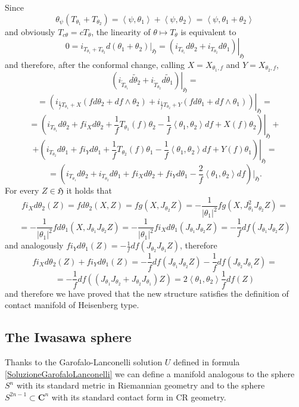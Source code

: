 \documentclass{article}
\newcommand{\g}[1]{\mathfrak{#1}}
\newcommand{\C}{\mathbf{C}}
\newcommand{\bra}{\left\langle}
\newcommand{\ket}{\right\rangle}
\theoremstyle{definition}
\theoremstyle{remark}
\begin{document}
Since
$$\theta_{\psi}(T_{\theta_1}+T_{\theta_2}) = \bra\psi,\theta_1\ket + \bra\psi,\theta_2\ket = \bra\psi,\theta_1+\theta_2\ket$$
and obviously $T_{c\theta}= cT_{\theta}$, the linearity of $\theta\mapsto T_{\theta}$ is equivalent to
$$0 = i_{T_{\theta_1}+T_{\theta_2}}d(\theta_1+\theta_2)|_{\g{H}} = \left.\left(i_{T_{\theta_1}}d\theta_2 + i_{T_{\theta_2}}d\theta_1\right)\right|_{\g{H}}$$
and therefore, after the conformal change, calling $X=X_{\theta_1,f}$ and $Y=X_{\theta_2,f}$,
$$\left.\left(i_{\widetilde{T}_{\theta_1}}d\widetilde{\theta}_2 + i_{\widetilde{T}_{\theta_2}}d\widetilde{\theta}_1\right)\right|_{\g{H}}=$$
$$= \left.\left(i_{\frac{1}{f}T_{\theta_1}+X}(fd\theta_2 +df\wedge\theta_2) + i_{\frac{1}{f}T_{\theta_2}+Y}(fd\theta_1 +df\wedge\theta_1)\right)\right|_{\g{H}}=$$
$$= \left.\left(i_{T_{\theta_1}}d\theta_2 + fi_Xd\theta_2  + \frac{1}{f}T_{\theta_1}(f)\theta_2 - \frac{1}{f}\bra\theta_1,\theta_2\ket df + X(f)\theta_2 \right)\right|_{\g{H}}+$$
$$+\left.\left(i_{T_{\theta_2}}d\theta_1 + fi_Yd\theta_1  + \frac{1}{f}T_{\theta_2}(f)\theta_1 - \frac{1}{f}\bra\theta_1,\theta_2\ket df + Y(f)\theta_1\right)\right|_{\g{H}}=$$
$$= \left(i_{T_{\theta_1}}d\theta_2 +i_{T_{\theta_2}}d\theta_1 + fi_Xd\theta_2 + fi_Yd\theta_1 - \frac{2}{f}\bra\theta_1,\theta_2\ket df \right)|_{\g{H}}.$$
For every $Z\in\g{H}$ it holds that
$$fi_Xd\theta_2(Z) = fd\theta_2(X,Z) = fg(X,J_{\theta_2}Z) = -\frac{1}{|\theta_1|^2}fg(X,J_{\theta_1}^2J_{\theta_2}Z) =$$
$$= -\frac{1}{|\theta_1|^2}fd\theta_1(X,J_{\theta_1}J_{\theta_2}Z) = -\frac{1}{|\theta_1|^2}fi_Xd\theta_1(J_{\theta_1}J_{\theta_2}Z) = -\frac{1}{f}df(J_{\theta_1}J_{\theta_2}Z)$$
and analogously $fi_Yd\theta_1(Z) = -\frac{1}{f}df(J_{\theta_2}J_{\theta_1}Z)$, therefore
$$fi_Xd\theta_2(Z)+fi_Yd\theta_1(Z) = -\frac{1}{f}df(J_{\theta_1}J_{\theta_2}Z) -\frac{1}{f}df(J_{\theta_2}J_{\theta_1}Z) =$$
$$= -\frac{1}{f}df((J_{\theta_1}J_{\theta_2} +J_{\theta_2}J_{\theta_1})Z) = 2\bra\theta_1,\theta_2\ket \frac{1}{f}df(Z)$$
and therefore we have proved that the new structure satisfies the definition of contact manifold of Heisenberg type.

\subsection{The Iwasawa sphere}\label{SezioneSfera}
Thanks to the Garofalo-Lanconelli solution $U$ defined in formula \eqref{SoluzioneGarofaloLanconelli} we can define a manifold analogous to the sphere $S^n$ with its standard metric in Riemannian geometry and to the sphere $S^{2n-1}\subset\C^n$ with its standard contact form in CR geometry.
\end{document}
